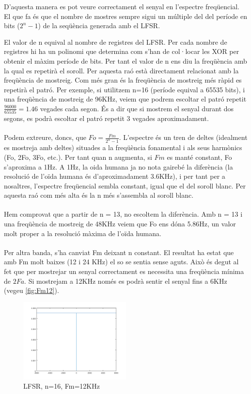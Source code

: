 \documentclass[11pt]{report}
\begin{document}
D'aquesta manera es pot veure correctament el senyal en l'espectre freqüencial. El que fa és que el nombre de mostres sempre sigui un múltiple del del període en bits ($2^n - 1$) de la seqüència generada amb el LFSR.

El valor de n equival al nombre de registres del LFSR. Per cada nombre de registres hi ha un polinomi que determina com s'han de col·locar les XOR per obtenir el màxim període de bits. Per tant el valor de n ens diu la freqüència amb la qual es repetirà el soroll. Per aquesta raó està directament relacionat amb la freqüència de mostreig. Com més gran és la freqüència de mostreig més ràpid es repetirà el patró. Per exemple, si utilitzem n=16 (període equival a 65535 bits), i una freqüència de mostreig de 96KHz, veiem que podrem escoltar el patró repetit $\frac{96000}{65535}=1.46$ vegades cada segon. És a dir que si mostrem el senyal durant dos segons, es podrà escoltar el patró repetit 3 vegades aproximadament.
\paragraph{}
Podem extreure, doncs, que $Fo=\frac{Fm}{2^n-1}$. L'espectre és un tren de deltes (idealment es mostreja amb deltes) situades a la freqüència fonamental i als seus harmònics (Fo, 2Fo, 3Fo, etc.). Per tant quan n augmenta, si $Fm$ es manté constant, Fo s'aproxima a 1Hz. A 1Hz, la oida humana ja no nota gairebé la diferència (la resolució de l'oïda humana és d'aproximadament 3.6KHz), i per tant per a nosaltres, l'espectre freqüencial sembla constant, igual que el del soroll blanc. Per aquesta raó com més alta és la n més s'assembla al soroll blanc.
\paragraph{}
Hem comprovat que a partir de n = 13, no escoltem la diferència. Amb n = 13 i una freqüència de mostreig de 48KHz veiem que Fo ens dóna 5.86Hz, un valor molt proper a la resolució màxima de l'oïda humana.

\paragraph{}
Per altra banda, s'ha canviat Fm deixant n constant. El resultat ha estat que amb Fm molt baixes (12 i 24 KHz) el so se sentia sense aguts.
Això és degut al fet que per mostrejar un senyal correctament es necessita una freqüència mínima de $2Fa$. Si mostrejam a 12KHz només es podrà sentir el senyal fins a 6KHz (vegeu \ref{fig:Fm12}).
\begin{figure}[h]
\label{Fm12}
  \centering
  \includegraphics[width=0.5\textwidth]{img/Fm12}
  \caption{LFSR, n=16, Fm=12KHz}
\end{figure}
\end{document}
